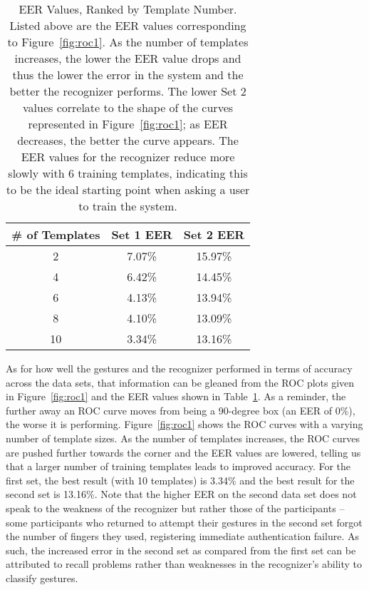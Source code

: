 \documentclass{sig-alternate-10pt}
\begin{document}
\begin{table}[h]
\begin{center}
\begin{tabular}{c|cc}
\# of Templates & Set 1 EER& Set 2 EER \\
\hline
 2 & 7.07\% & 15.97\% \\
4 & 6.42\% & 14.45\% \\
6 & 4.13\% & 13.94\% \\
8 & 4.10\% & 13.09\% \\
10 & 3.34\% & 13.16\% \\

\end{tabular}
\end{center}
\caption{EER Values, Ranked by Template Number. Listed above are the EER values corresponding to Figure~\ref{fig:roc1}. As the number of templates increases, the lower the EER value drops and thus the lower the error in the system and the better the recognizer performs. The lower Set 2 values correlate to the shape of the curves represented in Figure~\ref{fig:roc1}; as EER decreases, the better the curve appears. The EER values for the recognizer reduce more slowly with 6 training templates, indicating this to be the ideal starting point when asking a user to train the system.}

\label{tab:eerges}
\end{table}

As for how well the gestures and the recognizer performed in terms of accuracy across the data sets, that information can be gleaned from  the ROC plots given in Figure~\ref{fig:roc1} and the EER values shown in Table~\ref{tab:eerges}. As a reminder, the further away an ROC curve moves from being a 90-degree box (an EER of 0\%), the worse it is performing. Figure~\ref{fig:roc1} shows the ROC curves with a varying number of template sizes. As the number of templates increases, the ROC curves are pushed further towards the corner and the EER values are lowered, telling us that a larger number of training templates leads to improved accuracy. For the first set, the best result (with 10 templates) is 3.34\% and the best result for the second set is 13.16\%. Note that the higher EER on the second data set does not speak to the weakness of the recognizer but rather those of the participants -- some participants who returned to attempt their gestures in the second set forgot the number of fingers they used, registering immediate authentication failure. As such, the increased error in the second set as compared from the first set can be attributed to recall problems rather than weaknesses in the recognizer's ability to classify gestures.
\end{document}
